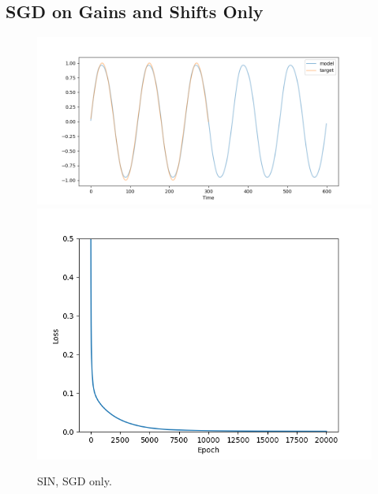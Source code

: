 \documentclass[12pt, a4paper]{article}
\begin{document}
\subsection*{SGD on Gains and Shifts Only}

\begin{figure}[H]
    \centering
    \includegraphics[width=\textwidth]{analysis/fig/1016_SIN_bpgain_output.png}\\
    \includegraphics[width=\textwidth]{analysis/fig/1016_SIN_bpgain_loss.png}
    \caption{SIN, SGD only.}
\end{figure}
\end{document}
